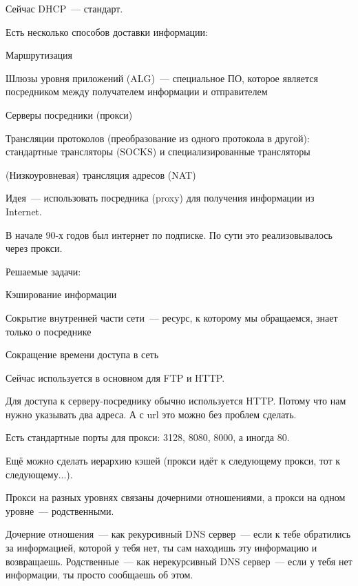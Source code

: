 Сейчас DHCP~--- стандарт.


Есть несколько способов доставки информации:
\begin{MyItemize}
    \item Маршрутизация
    \item Шлюзы уровня приложений (ALG)~--- специальное ПО, которое является посредником между получателем информации и отправителем
    \begin{MyItemize}
        \item Серверы посредники (прокси)
        \item Трансляции протоколов (преобразование из одного протокола в другой): стандартные трансляторы (SOCKS) и специализированные трансляторы
    \end{MyItemize}
    \item (Низкоуровневая) трансляция адресов (NAT)
\end{MyItemize} 


Идея~--- использовать посредника (proxy) для получения информации из Internet.

В начале 90-х годов был интернет по подписке. По сути это реализовывалось через прокси.

Решаемые задачи:
\begin{MyItemize}
    \item Кэширование информации
    \item Сокрытие внутренней части сети~--- ресурс, к которому мы обращаемся, знает только о посреднике
    \item Сокращение времени доступа в сеть
\end{MyItemize}

Сейчас используется в основном для FTP и HTTP.

Для доступа к серверу-посреднику обычно используется HTTP. Потому что нам нужно указывать два адреса. А с url это можно без проблем сделать.

Есть стандартные порты для прокси: 3128, 8080, 8000, а иногда 80.

Ещё можно сделать иерархию кэшей (прокси идёт к следующему прокси, тот к следующему...).

Прокси на разных уровнях связаны дочерними отношениями, а прокси на одном уровне~--- родственными.

Дочерние отношения~--- как рекурсивный DNS сервер~--- если к тебе обратились за информацией, которой у тебя нет, ты сам находишь эту информацию и возвращаешь. Родственные~--- как нерекурсивный DNS сервер~--- если у тебя нет информации, ты просто сообщаешь об этом.

